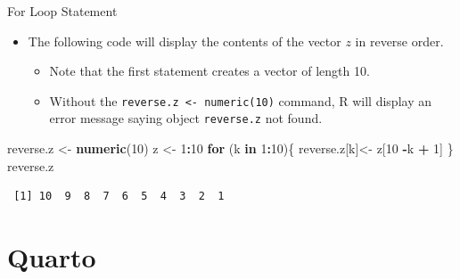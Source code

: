 \documentclass[
  ignorenonframetext,
]{beamer}
\newenvironment{Shaded}{\begin{snugshade}}{\end{snugshade}}
\newcommand{\ControlFlowTok}[1]{\textcolor[rgb]{0.13,0.29,0.53}{\textbf{#1}}}
\newcommand{\DecValTok}[1]{\textcolor[rgb]{0.00,0.00,0.81}{#1}}
\newcommand{\FunctionTok}[1]{\textcolor[rgb]{0.13,0.29,0.53}{\textbf{#1}}}
\newcommand{\NormalTok}[1]{#1}
\newcommand{\OtherTok}[1]{\textcolor[rgb]{0.56,0.35,0.01}{#1}}
\newcommand{\SpecialCharTok}[1]{\textcolor[rgb]{0.81,0.36,0.00}{\textbf{#1}}}
\providecommand{\tightlist}{%
  \setlength{\itemsep}{0pt}\setlength{\parskip}{0pt}}
\begin{document}
\begin{frame}[fragile]{For Loop Statement}
\label{for-loop-statement-2}
\begin{itemize}
\item
  The following code will display the contents of the vector \(z\) in
  reverse order.

  \begin{itemize}
  \tightlist
  \item
    Note that the first statement creates a vector of length 10.
  \item
    Without the \texttt{reverse.z\ \textless{}-\ numeric(10)} command, R
    will display an error message saying object \texttt{reverse.z} not
    found.
  \end{itemize}
\end{itemize}

\small

\begin{Shaded}
\begin{Highlighting}[]
\NormalTok{reverse.z }\OtherTok{\textless{}{-}} \FunctionTok{numeric}\NormalTok{(}\DecValTok{10}\NormalTok{)}
\NormalTok{z }\OtherTok{\textless{}{-}} \DecValTok{1}\SpecialCharTok{:}\DecValTok{10}
\ControlFlowTok{for}\NormalTok{ (k }\ControlFlowTok{in} \DecValTok{1}\SpecialCharTok{:}\DecValTok{10}\NormalTok{)\{}
\NormalTok{  reverse.z[k]}\OtherTok{\textless{}{-}}\NormalTok{ z[}\DecValTok{10} \SpecialCharTok{{-}}\NormalTok{k }\SpecialCharTok{+} \DecValTok{1}\NormalTok{]}
\NormalTok{\}}
\NormalTok{reverse.z}
\end{Highlighting}
\end{Shaded}

\begin{verbatim}
 [1] 10  9  8  7  6  5  4  3  2  1
\end{verbatim}

\normalsize
\end{frame}

\section{Quarto}\label{quarto}
\end{document}
